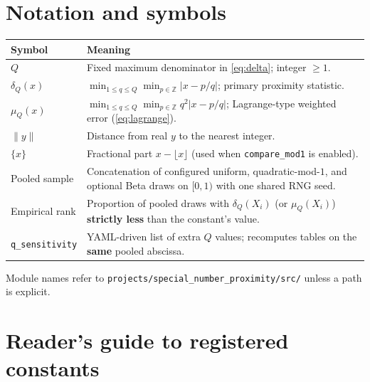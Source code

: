 \documentclass[
]{article}
\newcounter{none} %
\begin{document}
\newpage

\section{Notation and symbols}\label{notation-and-symbols}

{\def\LTcaptype{none} %
\begin{longtable}[]{@{}
  >{\raggedright\arraybackslash}p{}
  >{\raggedright\arraybackslash}p{}@{}}
\toprule\noalign{}
\begin{minipage}[b]{\linewidth}\raggedright
Symbol
\end{minipage} & \begin{minipage}[b]{\linewidth}\raggedright
Meaning
\end{minipage} \\
\midrule\noalign{}
\endhead
\bottomrule\noalign{}
\endlastfoot
\(Q\) & Fixed maximum denominator in \eqref{eq:delta}; integer
\(\geq 1\). \\
\(\delta_Q(x)\) & \(\min_{1\le q\le Q}\min_{p\in\mathbb{Z}} |x-p/q|\);
primary proximity statistic. \\
\(\mu_Q(x)\) & \(\min_{1\le q\le Q}\min_{p\in\mathbb{Z}} q^2|x-p/q|\);
Lagrange-type weighted error (\eqref{eq:lagrange}). \\
\(\|y\|\) & Distance from real \(y\) to the nearest integer. \\
\(\{x\}\) & Fractional part \(x-\lfloor x\rfloor\) (used when
\texttt{compare\_mod1} is enabled). \\
Pooled sample & Concatenation of configured uniform,
quadratic-mod-\(1\), and optional Beta draws on \([0,1)\) with one
shared RNG seed. \\
Empirical rank & Proportion of pooled draws with \(\delta_Q(X_i)\) (or
\(\mu_Q(X_i)\)) \textbf{strictly less} than the constant's value. \\
\texttt{q\_sensitivity} & YAML-driven list of extra \(Q\) values;
recomputes tables on the \textbf{same} pooled abscissa. \\
\end{longtable}
}

Module names refer to \texttt{projects/special\_number\_proximity/src/}
unless a path is explicit.

\newpage

\section{Reader's guide to registered
constants}\label{readers-guide-to-registered-constants}
\end{document}
